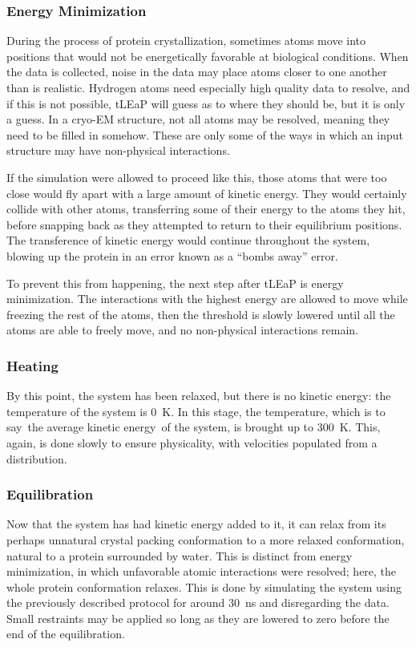 \subsubsection{Energy Minimization}

During the process of protein crystallization, sometimes atoms move into positions that would not be energetically favorable at biological conditions. When the data is collected, noise in the data may place atoms closer to one another than is realistic. Hydrogen atoms need especially high quality data to resolve, and if this is not possible, tLEaP will guess as to where they should be, but it is only a guess. In a cryo-EM structure, not all atoms may be resolved, meaning they need to be filled in somehow. These are only some of the ways in which an input structure may have non-physical interactions.

If the simulation were allowed to proceed like this, those atoms that were too close would fly apart with a large amount of kinetic energy. They would certainly collide with other atoms, transferring some of their energy to the atoms they hit, before snapping back as they attempted to return to their equilibrium positions. The transference of kinetic energy would continue throughout the system, blowing up the protein in an error known as a ``bombs away'' error.

To prevent this from happening, the next step after tLEaP is energy minimization. The interactions with the highest energy are allowed to move while freezing the rest of the atoms, then the threshold is slowly lowered until all the atoms are able to freely move, and no non-physical interactions remain.

\subsubsection{Heating}

By this point, the system has been relaxed, but there is no kinetic energy: the temperature of the system is \qty{0}{\kelvin}. In this stage, the temperature, which is to say the average kinetic energy of the system, is brought up to \qty{300}{\kelvin}. This, again, is done slowly to ensure physicality, with velocities populated from a distribution.

\subsubsection{Equilibration}

Now that the system has had kinetic energy added to it, it can relax from its perhaps unnatural crystal packing conformation to a more relaxed conformation, natural to a protein surrounded by water. This is distinct from energy minimization, in which unfavorable atomic interactions were resolved; here, the whole protein conformation relaxes. This is done by simulating the system using the previously described protocol for around \qty{30}{\nano\second} and disregarding the data. Small restraints may be applied so long as they are lowered to zero before the end of the equilibration.

